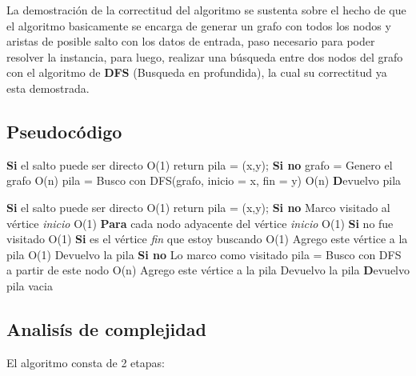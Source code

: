 La demostración de la correctitud del algoritmo se sustenta sobre el hecho de que el algoritmo basicamente se encarga de generar un grafo con todos los nodos y aristas de posible salto con los datos de entrada, paso necesario para poder resolver la instancia, para luego, realizar una búsqueda entre dos nodos del grafo con el algoritmo de \textbf{DFS} (Busqueda en profundida), la cual su correctitud ya esta demostrada. 


\subsection{Pseudoc\'odigo}
\begin{codebox}
\li	\textbf{Si} el salto puede ser directo \Do \RComment O(1)
\li		return pila = (x,y); \End
\li	\textbf{Si no}  \Do
\li		grafo = Genero el grafo 				\RComment O(n)
\li		pila = Busco con DFS(grafo, inicio = x, fin = y)	\RComment O(n)\End 
\li	\textbf Devuelvo pila
\end{codebox}

\begin{codebox}
\li	\textbf{Si} el salto puede ser directo \Do 							\RComment O(1)
\li		return pila = (x,y); \End
\li	\textbf{Si no}  \Do
\li		Marco visitado al vértice \textit{inicio}						\RComment O(1)
\li		\textbf{Para} cada nodo adyacente del vértice \textit{inicio} \Do 	\RComment O(1)
\li			\textbf{Si} no fue visitado \Do \RComment O(1)
\li				\textbf{Si} es el vértice \textit{fin} que estoy buscando \Do \RComment O(1)	
\li					Agrego este vértice a la pila					\RComment O(1)
\li					Devuelvo la pila\End
\li				\textbf{Si no}  \Do
\li					Lo marco como visitado
\li					pila = Busco con DFS a partir de este nodo			\RComment O(n)
\li					Agrego este vértice a la pila
\li					Devuelvo la pila\End\End\End
\li	\textbf Devuelvo pila vacia
\end{codebox}

\subsection{Analisís de complejidad}	
El algoritmo consta de 2 etapas:\\ 



